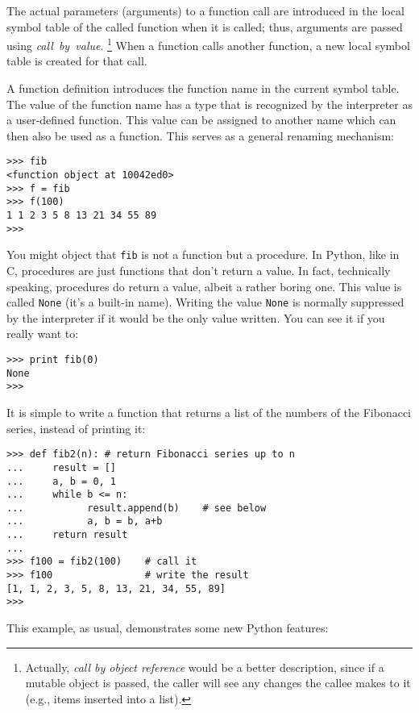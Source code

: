 The actual parameters (arguments) to a function call are introduced in
the local symbol table of the called function when it is called; thus,
arguments are passed using {\em call\ by\ value}.%
\footnote{
         Actually, {\em call  by  object reference} would be a better
         description, since if a mutable object is passed, the caller
         will see any changes the callee makes to it (e.g., items
         inserted into a list).
}
When a function calls another function, a new local symbol table is
created for that call.

A function definition introduces the function name in the
current
symbol table.  The value
of the function name
has a type that is recognized by the interpreter as a user-defined
function.  This value can be assigned to another name which can then
also be used as a function.  This serves as a general renaming
mechanism:

\bcode\begin{verbatim}
>>> fib
<function object at 10042ed0>
>>> f = fib
>>> f(100)
1 1 2 3 5 8 13 21 34 55 89
>>> 
\end{verbatim}\ecode
%
You might object that {\tt fib} is not a function but a procedure.  In
Python, like in C, procedures are just functions that don't return a
value.  In fact, technically speaking, procedures do return a value,
albeit a rather boring one.  This value is called {\tt None} (it's a
built-in name).  Writing the value {\tt None} is normally suppressed by
the interpreter if it would be the only value written.  You can see it
if you really want to:

\bcode\begin{verbatim}
>>> print fib(0)
None
>>> 
\end{verbatim}\ecode
%
It is simple to write a function that returns a list of the numbers of
the Fibonacci series, instead of printing it:

\bcode\begin{verbatim}
>>> def fib2(n): # return Fibonacci series up to n
...     result = []
...     a, b = 0, 1
...     while b <= n:
...           result.append(b)    # see below
...           a, b = b, a+b
...     return result
... 
>>> f100 = fib2(100)    # call it
>>> f100                # write the result
[1, 1, 2, 3, 5, 8, 13, 21, 34, 55, 89]
>>> 
\end{verbatim}\ecode
%
This example, as usual, demonstrates some new Python features:

